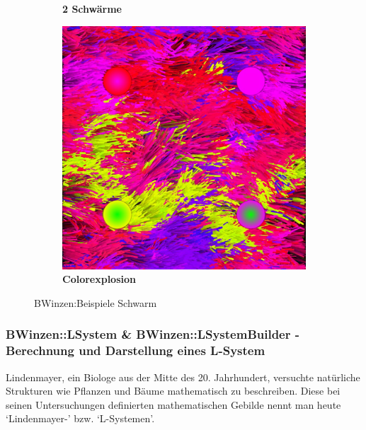 \documentclass[../mciAusarbeitung.tex]{subfiles}
\begin{document}
\begin{figure}[H]
\begin{subfigure}{0.5\linewidth}
			\caption[2 Schwärme]{\textbf{2 Schwärme}}  
		\end{subfigure}		
		\begin{subfigure}{0.5\linewidth}
	 		\includegraphics[width=0.95\linewidth]{"img/swarm_fading.jpg"}
			\caption[Colorexplosion]{\textbf{Colorexplosion}}  
		\end{subfigure}	
	\caption[BWinzen:Beispiele Schwarm]{BWinzen:Beispiele Schwarm}
\end{figure}

\subsubsection{BWinzen::LSystem \& BWinzen::LSystemBuilder - Berechnung und Darstellung eines L-System}
	Lindenmayer, ein Biologe aus der Mitte des 20. Jahrhundert, versuchte natürliche Strukturen wie Pflanzen und Bäume mathematisch zu beschreiben. Diese bei seinen Untersuchungen definierten mathematischen Gebilde nennt man heute `Lindenmayer-' bzw. `L-Systemen'.  
	
\end{document}
